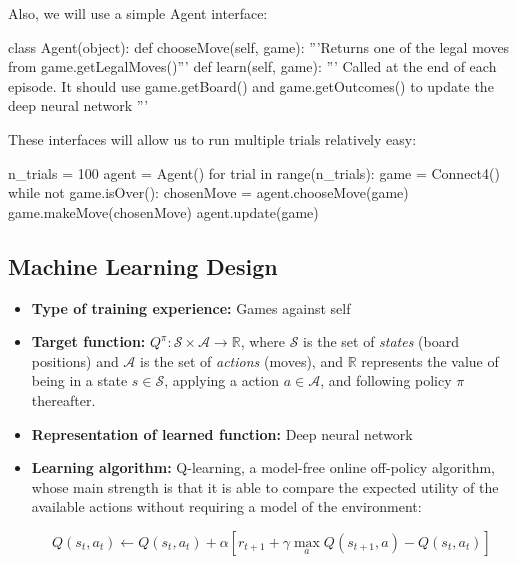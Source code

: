 \documentclass{article}
\begin{document}
\noindent Also, we will use a simple \textrm{Agent} interface:

\begin{python}
class Agent(object):
    def chooseMove(self, game):
        '''Returns one of the legal moves from game.getLegalMoves()'''
    def learn(self, game):
        '''
        Called at the end of each episode. It should use game.getBoard()
        and game.getOutcomes() to update the deep neural network
        '''

\end{python}

\noindent
These interfaces will allow us to run multiple trials relatively easy:

\begin{python}
n_trials = 100
agent = Agent()
for trial in range(n_trials):
    game = Connect4()
    while not game.isOver():
        chosenMove = agent.chooseMove(game)
        game.makeMove(chosenMove)
    agent.update(game)
\end{python}

\subsection{Machine Learning Design}

\begin{itemize}

    \item \textbf{Type of training experience:} Games against self

    \item \textbf{Target function:} $Q^\pi : \mathcal{S} \times \mathcal{A} \to \mathbb{R}$, where
        $\mathcal{S}$ is the set of \emph{states} (board positions) and $\mathcal{A}$ is the set of
        \emph{actions} (moves), and $\mathbb{R}$ represents the value of being in a state $s \in
        \mathcal{S}$, applying a action $a \in \mathcal{A}$, and following policy $\pi$ thereafter.

    \item \textbf{Representation of learned function:} Deep neural network

    \item \textbf{Learning algorithm:} Q-learning, a model-free online off-policy algorithm, whose
        main strength is that it is able to compare the expected utility of the available actions
        without requiring a model of the environment:

        \begin{equation}
        Q(s_t, a_t) \gets Q(s_t, a_t) + \alpha [r_{t+1} + \gamma \max_a Q(s_{t+1}, a) - Q(s_t, a_t)]
        \end{equation}


\end{itemize}
\end{document}
